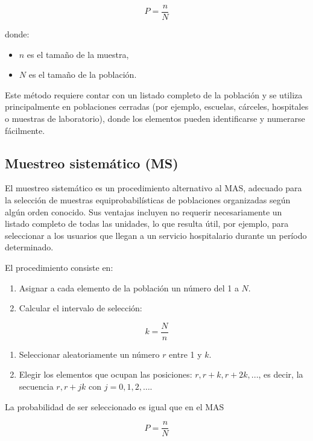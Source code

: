 \documentclass[
  spanish,
  a4paper,
]{scrbook}
\begin{document}
\[
P = \frac{n}{N}
\]

donde:

\begin{itemize}
\item
  \(n\) es el tamaño de la muestra,
\item
  \(N\) es el tamaño de la población.
\end{itemize}

Este método requiere contar con un listado completo de la población y se
utiliza principalmente en poblaciones cerradas (por ejemplo, escuelas,
cárceles, hospitales o muestras de laboratorio), donde los elementos
pueden identificarse y numerarse fácilmente.

\subsection{Muestreo sistemático (MS)}\label{muestreo-sistemuxe1tico-ms}

El muestreo sistemático es un procedimiento alternativo al MAS, adecuado
para la selección de muestras equiprobabilísticas de poblaciones
organizadas según algún orden conocido. Sus ventajas incluyen no
requerir necesariamente un listado completo de todas las unidades, lo
que resulta útil, por ejemplo, para seleccionar a los usuarios que
llegan a un servicio hospitalario durante un período determinado.

El procedimiento consiste en:

\begin{enumerate}
\def\labelenumi{\arabic{enumi}.}
\item
  Asignar a cada elemento de la población un número del 1 a \(N\).
\item
  Calcular el intervalo de selección:
\end{enumerate}

\[
k = \frac{N}{n}
\]

\begin{enumerate}
\def\labelenumi{\arabic{enumi}.}
\setcounter{enumi}{2}
\item
  Seleccionar aleatoriamente un número \(r\) entre 1 y \(k\).
\item
  Elegir los elementos que ocupan las posiciones:
  \(r, r+k, r + 2k,...\), es decir, la secuencia \(r, r+jk\) con
  \(j = 0, 1, 2, \dots\).
\end{enumerate}

La probabilidad de ser seleccionado es igual que en el MAS

\[
P = \frac{n}{N} 
\]
\end{document}
